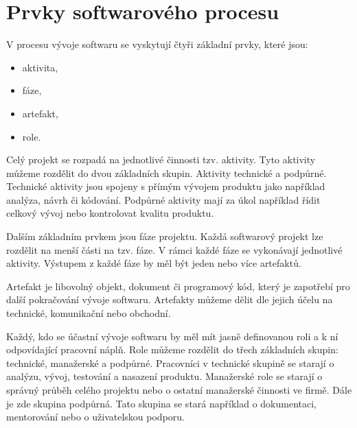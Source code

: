 \documentclass[czech,DP]{thesiskiv}
\begin{document}
\section{Prvky softwarového procesu}
V procesu vývoje softwaru se vyskytují čtyři základní prvky, které jsou:
\begin{itemize}
    \item aktivita,
    \item fáze,
    \item artefakt,
    \item role.
\end{itemize}
Celý projekt se rozpadá na jednotlivé činnosti tzv. aktivity. Tyto aktivity můžeme rozdělit do dvou základních skupin. Aktivity technické a podpůrné. Technické aktivity jsou spojeny s přímým vývojem produktu jako například analýza, návrh či kódování. Podpůrné aktivity mají za úkol například řídit celkový vývoj nebo kontrolovat kvalitu produktu.
\par
Dalším základním prvkem jsou fáze projektu. Každá softwarový projekt lze rozdělit na menší části na tzv. fáze. V rámci každé fáze se vykonávají jednotlivé aktivity. Výstupem z každé fáze by měl být jeden nebo více artefaktů.
\par
Artefakt je libovolný objekt, dokument či programový kód, který je zapotřebí pro další pokračování vývoje softwaru. Artefakty můžeme dělit dle jejich účelu na technické, komunikační nebo obchodní.
\par
Každý, kdo se účastní vývoje softwaru by měl mít jasně definovanou roli a k ní odpovídající pracovní náplň. Role můžeme rozdělit do třech základních skupin: technické, manažerské a podpůrné. Pracovníci v technické skupině se starají o analýzu, vývoj, testování a nasazení produktu. Manažerské role se starají o správný průběh celého projektu nebo o ostatní manažerské činnosti ve firmě. Dále je zde skupina podpůrná. Tato skupina se stará například o dokumentaci, mentorování nebo o uživatelskou podporu.
\end{document}
